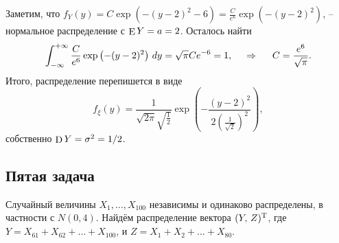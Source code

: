 Заметим, что $f_Y (y) =  C \exp\left(
        - (y-2)^2 - 6
    \right) =  \frac{C}{e^6} \exp\left(
        - (y-2)^2
    \right)$, -- нормальное распределение с $\mathop{\mathrm{E}}\nolimits Y = a = 2$. 
Осталось найти
\begin{equation*}
    \int_{-\infty}^{+\infty} \frac{C}{e^6} \exp\left(
        - (y-2)^2
    \right) \, d y = \sqrt{\pi} C e^{-6} = 1,
    \hspace{0.5cm} \Rightarrow \hspace{0.5cm}
    C = \frac{e^6}{\sqrt{\pi}}.
\end{equation*}
Итого, распределение перепишется в виде
\begin{equation*}
    f_\xi(y) = \frac{1}{\sqrt{2\pi} \sqrt{\frac{1}{2}}} \exp\left(
        - \frac{(y-2)^2}{2 (\frac{1}{\sqrt{2}})^2}
    \right),
\end{equation*}
собственно $\mathop{\mathrm{D}}\nolimits Y = \sigma^2 = 1/2$. 







\subsection*{Пятая задача}

Случайный величины $X_1, \ldots, X_{100}$ независимы и одинаково распределены, в частности с $N(0, 4)$. Найдём распределение вектора $(Y,\, Z)^{\text{T}}$, где $Y = X_{61} + X_{62} + \ldots + X_{100}$, и $Z = X_1 + X_2 + \ldots + X_{80}$.


